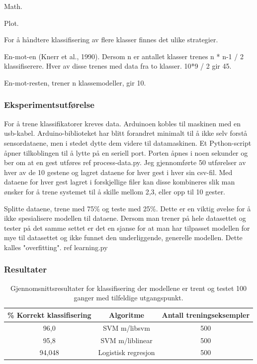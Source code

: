 Math.

Plot.

For å håndtere klassifisering av flere klasser finnes det ulike strategier.

En-mot-en (Knerr et al., 1990). Dersom n er antallet klasser trenes n * n-1 / 2 klassifiserere. Hver av disse trenes med data fra to klasser. 10*9 / 2 gir 45.

En-mot-resten, trener n klassemodeller, gir 10.

\subsubsection{Eksperimentsutførelse}
For å trene klassifikatorer kreves data. Arduinoen kobles til maskinen med en usb-kabel. Arduino-biblioteket har blitt forandret minimalt til å ikke selv forstå sensordataene, men i stedet dytte dem videre til datamaskinen. Et Python-script åpner tilkoblingen til å lytte på en seriell port. Porten åpnes i noen sekunder og ber om at en gest utføres {\color{red} ref process-data.py}. Jeg gjennomførte 50 utførelser av hver av de 10 gestene og lagret dataene for hver gest i hver sin csv-fil. Med dataene for hver gest lagret i forskjellige filer kan disse kombineres slik man ønsker for å trene systemet til å skille mellom 2,3, eller opp til 10 gester. 

Splitte dataene, trene med 75\% og teste med 25\%. Dette er en viktig øvelse for å ikke spesialisere modellen til dataene. Dersom man trener på hele datasettet og tester på det samme settet er det en sjanse for at man har tilpasset modellen for mye til datasettet og ikke funnet den underliggende, generelle modellen. Dette kalles "overfitting". {\color{red} ref learning.py}

\subsubsection{Resultater}
\label{ch:2.resultater}
\begin{table}[h!]
\centering
\begin{tabular}{|| c c c ||}
\hline
\% Korrekt klassifisering & Algoritme & Antall treningseksempler\\ [0.5ex] 
 \hline\hline
 96,0 & SVM m/libsvm & 500 \\ 
 \hline
 95,8 & SVM m/liblinear & 500 \\
 \hline
 94,048 & Logistisk regresjon & 500 \\ [1ex]
 \hline
\end{tabular}
\caption{Gjennomsnittsresultater for klassifisering der modellene er trent og testet 100 ganger med tilfeldige utgangspunkt.}
\label{table:results}
\end{table}

